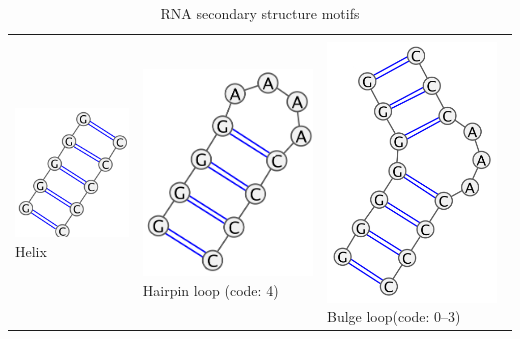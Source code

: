 \documentclass[12pt]{article}
\begin{document}
\begin{table}
\caption{RNA secondary structure motifs}
\label{RNAsecondaryStructures}
\begin{tabular}
{ >{\centering} p{5.5cm} >{\centering} p{5.5cm} >{\centering} p{5.5cm}}
&& \tabularnewline
 \includegraphics[width=4.5cm]{./pictures/helix_varna.PNG}  \linebreak Helix 
 & \includegraphics[width=4.5cm]{./pictures/hairpin_varna.PNG}  Hairpin loop \linebreak (code: 4) &  \includegraphics[width=4.5cm]{./pictures/bulge_varna.PNG} Bulge loop\linebreak  (code: 0--3) \tabularnewline

\end{tabular}
\end{table}
\end{document}
